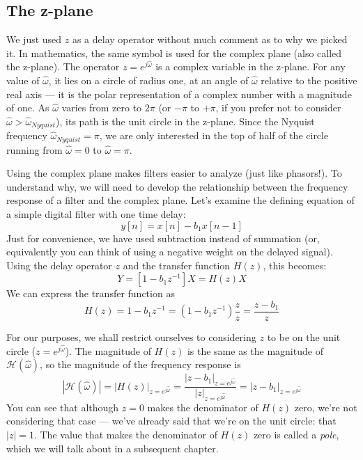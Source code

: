 \subsection{The z-plane}

We just used $z$ as a delay operator without much comment as to why we
picked it. In mathematics, the same symbol is used for the complex plane (also called the z-plane).  The
operator $z=e^{j\hat{\omega}}$ is a complex variable in the
z-plane. For any value of $\hat{\omega}$, it lies on a circle of radius one,
at an angle of $\hat{\omega}$ relative to the positive real axis --- it is
the polar representation of a complex number with a magnitude of one. As $\hat{\omega}$ varies from
zero to $2\pi$ (or $-\pi$ to $+\pi$, if you prefer not to consider
$\hat{\omega} > \hat{\omega}_\mathit{Nyquist}$), its path is the unit circle in
the z-plane. Since the Nyquist frequency
$\hat{\omega}_\mathit{Nyquist}=\pi$, we are only interested in the top of half
of the circle running from $\hat{\omega}=0$ to $\hat{\omega}=\pi$.

Using the complex plane makes filters easier to analyze (just like phasors!). To understand why, we will need to develop the relationship between the frequency response of a filter and the complex plane. Let's examine the defining equation of a simple digital filter with
one time delay:
\begin{equation}
y[n] = x[n]-b_1x[n-1]
\end{equation}
Just for convenience, we have used subtraction instead of summation
(or, equivalently you can think of using a negative weight on the
delayed signal). Using the delay operator $z$ and the transfer
function $H(z)$, this becomes:
\begin{equation}
Y = [1-b_1z^{-1}]X = H(z)X
\end{equation}
We can express the transfer function as
\begin{equation}
H(z) = 1-b_1z^{-1} = (1-b_1z^{-1}) \frac{z}{z} = \frac{z-b_1}{z}
\end{equation}

For our purposes, we shall restrict ourselves to considering $z$ to be
on the unit circle ($z=e^{j\hat{\omega}}$). The magnitude of $H(z)$ is
the same as the magnitude of $\mathcal{H}(\hat{\omega})$, so the
magnitude of the frequency response is
\begin{equation}
|\mathcal{H}(\hat{\omega})| = |H(z)|_{z=e^{j\hat{\omega}}}
       = \frac{|z-b_1|_{z=e^{j\hat{\omega}}}}{|z|_{z=e^{j\hat{\omega}}}}
       = |z-b_1|_{z=e^{j\hat{\omega}}}
\label{eq:ff-simplez}
\end{equation}
You can see that
although $z=0$ makes the denominator of $H(z)$ zero, we're not
considering that case --- we've already said that we're on the unit
circle: that $|z|=1$.  The value that makes the denominator of
$H(z)$ zero is called a \emph{pole}, which we will talk
about in a subsequent chapter.

